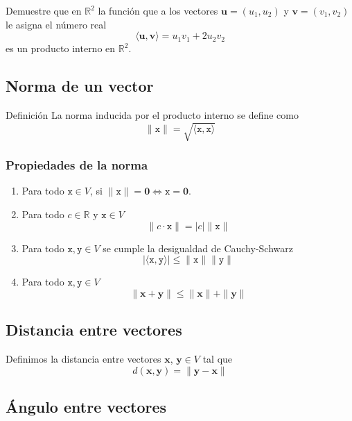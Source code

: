 \documentclass[
]{article}
\begin{document}
Demuestre que en \(\mathbb{R}^2\) la función que a los vectores
\(\mathbf{u}=(u_1,u_2)\) y \(\mathbf{v}=(v_1,v_2)\) le asigna el número
real \[
        \langle \mathbf{u}, \mathbf{v}\rangle = u_1v_1 + 2u_2v_2
\] es un producto interno en \(\mathbb{R}^2\).

\hypertarget{norma-de-un-vector}{%
\subsection{Norma de un vector}\label{norma-de-un-vector}}

Definición La norma inducida por el producto interno se define como
\begin{equation}
    \|\mathtt{x}\| = \sqrt{\langle \mathtt{x}, \mathtt{x}  \rangle}
  \end{equation}

\hypertarget{propiedades-de-la-norma}{%
\subsubsection{Propiedades de la norma}\label{propiedades-de-la-norma}}

\begin{enumerate}
\def\labelenumi{\alph{enumi})}
\item
  Para todo \(\mathtt{x}\in V\), si
  \(\|\mathtt{x}\|= \mathbf{0} \Leftrightarrow \mathtt{x}=\mathbf{0}\).
\item
  Para todo \(c\in \mathbb{R}\) y \(\mathtt{x}\in V\) \[
  \|c\cdot \mathtt{x}\| = |c|\|\mathtt{x}\|
  \]
\item
  Para todo \(\mathtt{x},\mathtt{y}\in V\) se cumple la desigualdad de
  Cauchy-Schwarz \[
  |\langle \mathtt{x},\mathtt{y} \rangle|\leq \|\mathtt{x} \|\|\mathtt{y} \|
  \]
\item
  Para todo \(\mathtt{x},\mathtt{y}\in V\) \[
  \|\mathbf{x}+\mathbf{y}\|\leq \|\mathbf{x}\| + \|\mathbf{y}\|
  \]
\end{enumerate}

\hypertarget{distancia-entre-vectores}{%
\subsection{Distancia entre vectores}\label{distancia-entre-vectores}}

Definimos la distancia entre vectores \(\mathbf{x}\),
\(\mathbf{y}\in V\) tal que \[
d(\mathbf{x},\mathbf{y})=\|\mathbf{y}-\mathbf{x}\|
\]

\hypertarget{uxe1ngulo-entre-vectores}{%
\subsection{Ángulo entre vectores}\label{uxe1ngulo-entre-vectores}}
\end{document}
